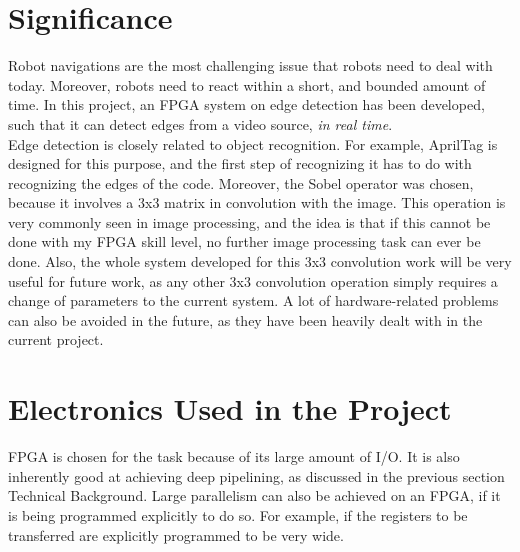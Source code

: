 \documentclass{article}
\begin{document}
	\section{Significance}
		Robot navigations are the most challenging issue that robots need to deal with today. Moreover, robots need to react within a short, and bounded amount of time. In this project, an FPGA system on edge detection has been developed, such that it can detect edges from a video source, \emph{in real time}.
	\\

		Edge detection is closely related to object recognition. For example, AprilTag is designed for this purpose, and the first step of recognizing it has to do with recognizing the edges of the code. Moreover, the Sobel operator was chosen, because it involves a 3x3 matrix in convolution with the image. This operation is very commonly seen in image processing, and the idea is that if this cannot be done with my FPGA skill level, no further image processing task can ever be done. Also, the whole system developed for this 3x3 convolution work will be very useful for future work, as any other 3x3 convolution operation simply requires a change of parameters to the current system. A lot of hardware-related problems can also be avoided in the future, as they have been heavily dealt with in the current project.
	\newpage\section{Electronics Used in the Project}
	FPGA is chosen for the task because of its large amount of I/O. It is also inherently good at achieving deep pipelining, as discussed in the previous section Technical Background. Large parallelism can also be achieved on an FPGA, if it is being programmed explicitly to do so. For example, if the registers to be transferred are explicitly programmed to be very wide.
	\\
	
\end{document}
